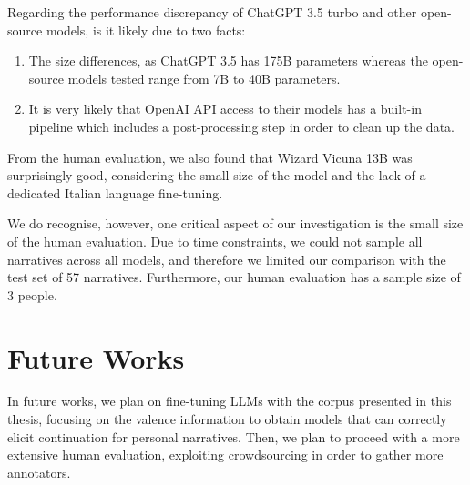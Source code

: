 Regarding the performance discrepancy of ChatGPT 3.5 turbo and other open-source models, is it likely due to two facts:
\begin{enumerate}
    \item The size differences, as ChatGPT 3.5 has 175B parameters \cite{chatgpt-parameters} whereas the open-source models tested range from 7B to 40B parameters.
    \item It is very likely that OpenAI API access to their models has a built-in pipeline which includes a post-processing step in order to clean up the data.
\end{enumerate}


From the human evaluation, we also found that Wizard Vicuna 13B was surprisingly good, considering the small size of the model and the lack of a dedicated Italian language fine-tuning.

We do recognise, however, one critical aspect of our investigation is the small size of the human evaluation. Due to time constraints, we could not sample all narratives across all models, and therefore we limited our comparison with the test set of 57 narratives. Furthermore, our human evaluation has a sample size of 3 people. 

\section{Future Works}
In future works, we plan on fine-tuning LLMs with the corpus presented in this thesis, focusing on the valence information to obtain models that can correctly elicit continuation for personal narratives. Then, we plan to proceed with a more extensive human evaluation, exploiting crowdsourcing in order to gather more annotators. 